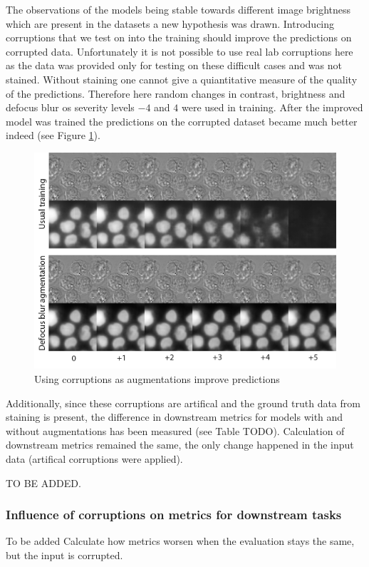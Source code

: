 The observations of the models being stable towards different image brightness which are present in the datasets a new hypothesis was drawn. Introducing corruptions that we test on into the training should improve the predictions on corrupted data. Unfortunately it is not possible to use real lab corruptions here as the data was provided only for testing on these difficult cases and was not stained. Without staining one cannot give a quiantitative measure of the quality of the predictions. Therefore here random changes in contrast, brightness and defocus blur os severity levels $-4$ and $4$ were used in training. After the improved model was trained the predictions on the corrupted dataset became much better indeed (see Figure \ref{fig:augments-help}).

\begin{figure}[htb]
	\begin{center}
		\includegraphics[width=0.4\linewidth]{bilder/stability/augments-help.png}
		\caption{Using corruptions as augmentations improve predictions}\label{fig:augments-help}
	\end{center}
\end{figure}

Additionally, since these corruptions are artifical and the ground truth data from staining is present, the difference in downstream metrics for models with and without augmentations has been measured (see Table TODO). Calculation of downstream metrics remained the same, the only change happened in the input data (artifical corruptions were applied).

TO BE ADDED.

\subsubsection{Influence of corruptions on metrics for downstream tasks}
To be added
Calculate how metrics worsen when the evaluation stays the same, but the input is corrupted.